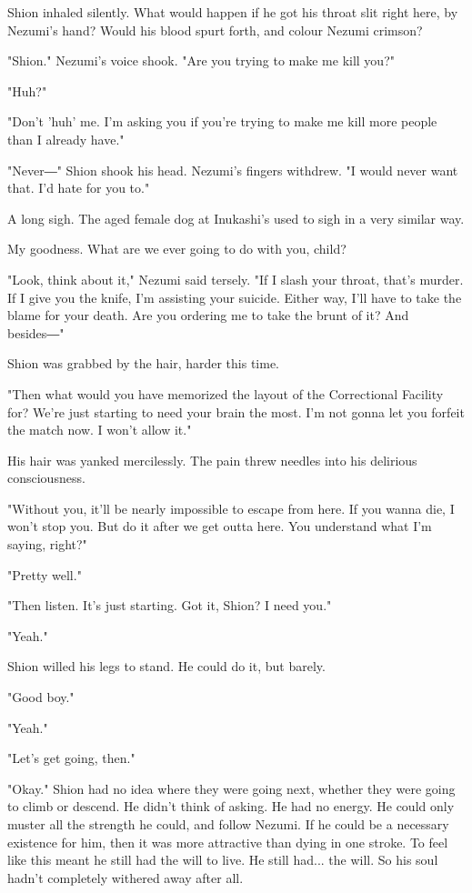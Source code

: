 Shion inhaled silently. What would happen if he got his throat slit
right here, by Nezumi's hand? Would his blood spurt forth, and colour
Nezumi crimson?

"Shion." Nezumi's voice shook. "Are you trying to make me kill you?"

"Huh?"

"Don't 'huh' me. I'm asking you if you're trying to make me kill more
people than I already have."

"Never―" Shion shook his head. Nezumi's fingers withdrew. "I would never
want that. I'd hate for you to."

A long sigh. The aged female dog at Inukashi's used to sigh in a very
similar way.

My goodness. What are we ever going to do with you, child?

"Look, think about it," Nezumi said tersely. "If I slash your throat,
that's murder. If I give you the knife, I'm assisting your suicide.
Either way, I'll have to take the blame for your death. Are you ordering
me to take the brunt of it? And besides―"

Shion was grabbed by the hair, harder this time.

"Then what would you have memorized the layout of the Correctional
Facility for? We're just starting to need your brain the most. I'm not
gonna let you forfeit the match now. I won't allow it."

His hair was yanked mercilessly. The pain threw needles into his
delirious consciousness.

"Without you, it'll be nearly impossible to escape from here. If you
wanna die, I won't stop you. But do it after we get outta here. You
understand what I'm saying, right?"

"Pretty well."

"Then listen. It's just starting. Got it, Shion? I need you."

"Yeah."

Shion willed his legs to stand. He could do it, but barely.

"Good boy."

"Yeah."

"Let's get going, then."

"Okay." Shion had no idea where they were going next, whether they were
going to climb or descend. He didn't think of asking. He had no energy.
He could only muster all the strength he could, and follow Nezumi. If he
could be a necessary existence for him, then it was more attractive than
dying in one stroke. To feel like this meant he still had the will to
live. He still had... the will. So his soul hadn't completely withered
away after all.

